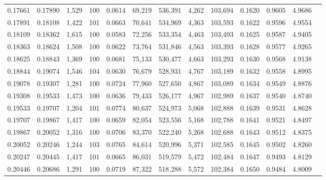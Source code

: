 \begin{tabular}{rrrrrrrrrrrrr}
0.17661 & 0.17890 & 1,529 & 100 &                                     0.0614 &  69,219 & 536,391 &   4,262 & 103,694 & 0.1620 & 0.9605 & 4.9686 \\
0.17891 & 0.18108 & 1,422 & 101 &                                     0.0663 &  70,641 & 534,969 &   4,363 & 103,593 & 0.1622 & 0.9596 & 4.9554 \\
0.18109 & 0.18362 & 1,615 & 100 &                                     0.0583 &  72,256 & 533,354 &   4,463 & 103,493 & 0.1625 & 0.9587 & 4.9405 \\
0.18363 & 0.18624 & 1,508 & 100 &                                     0.0622 &  73,764 & 531,846 &   4,563 & 103,393 & 0.1628 & 0.9577 & 4.9265 \\
0.18625 & 0.18843 & 1,369 & 100 &                                     0.0681 &  75,133 & 530,477 &   4,663 & 103,293 & 0.1630 & 0.9568 & 4.9138 \\
0.18844 & 0.19074 & 1,546 & 104 &                                     0.0630 &  76,679 & 528,931 &   4,767 & 103,189 & 0.1632 & 0.9558 & 4.8995 \\
0.19078 & 0.19307 & 1,281 & 100 &                                     0.0724 &  77,960 & 527,650 &   4,867 & 103,089 & 0.1634 & 0.9549 & 4.8876 \\
0.19308 & 0.19533 & 1,473 & 100 &                                     0.0636 &  79,433 & 526,177 &   4,967 & 102,989 & 0.1637 & 0.9540 & 4.8740 \\
0.19533 & 0.19707 & 1,204 & 101 &                                     0.0774 &  80,637 & 524,973 &   5,068 & 102,888 & 0.1639 & 0.9531 & 4.8628 \\
0.19707 & 0.19867 & 1,417 & 100 &                                     0.0659 &  82,054 & 523,556 &   5,168 & 102,788 & 0.1641 & 0.9521 & 4.8497 \\
0.19867 & 0.20052 & 1,316 & 100 &                                     0.0706 &  83,370 & 522,240 &   5,268 & 102,688 & 0.1643 & 0.9512 & 4.8375 \\
0.20052 & 0.20246 & 1,244 & 103 &                                     0.0765 &  84,614 & 520,996 &   5,371 & 102,585 & 0.1645 & 0.9502 & 4.8260 \\
0.20247 & 0.20445 & 1,417 & 101 &                                     0.0665 &  86,031 & 519,579 &   5,472 & 102,484 & 0.1647 & 0.9493 & 4.8129 \\
0.20446 & 0.20686 & 1,291 & 100 &                                     0.0719 &  87,322 & 518,288 &   5,572 & 102,384 & 0.1650 & 0.9484 & 4.8009 \\

\end{tabular}
